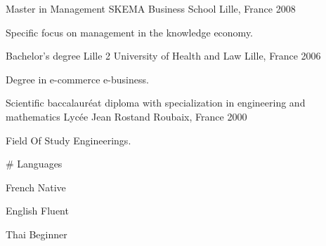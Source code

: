 

\begin{cventries}

  \cventry
    {Master in Management} %
    {SKEMA Business School} %
    {Lille, France} %
    {2008} %
    {
      \begin{cvitems} %
        \item {Specific focus on management in the knowledge economy.}
      \end{cvitems}
    }
    { } %
  \cventry
    {Bachelor's degree} %
    {Lille 2 University of Health and Law} %
    {Lille, France} %
    {2006} %
    {
      \begin{cvitems} %
        \item {Degree in e-commerce e-business.}
      \end{cvitems}
    }
    { } %
      \cventry
        {Scientific baccalauréat diploma with specialization in engineering and mathematics} %
        {Lycée Jean Rostand} %
        {Roubaix, France} %
        {2000} %
        {
          \begin{cvitems} %
            \item {Field Of Study Engineerings.}
          \end{cvitems}
        }
        { } %
  \cventry
    {} %
    {\# Languages} %
    { } %
    { } %
    {
      \begin{cvitems} %
        \item {French Native}
        \item {English Fluent}
        \item {Thai Beginner}
      \end{cvitems}
    }
    { } %

\end{cventries}
